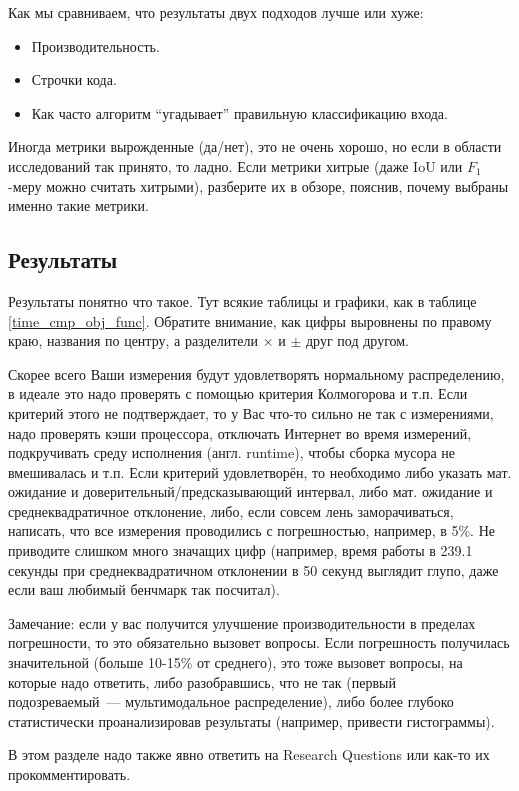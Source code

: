 Как мы сравниваем, что результаты двух подходов лучше или хуже:
\begin{itemize}
    \item Производительность.
    \item Строчки кода.
    \item Как часто алгоритм \enquote{угадывает} правильную класси\-фикацию входа.
\end{itemize}

\noindent Иногда метрики вырожденные (да/нет), это не очень хорошо, но если в области исследований так принято, то ладно.
Если метрики хитрые (даже IoU или $F_1$-меру можно считать хитрыми), разберите их в обзоре, пояснив, почему выбраны именно такие метрики.

\subsection{Результаты}
Результаты понятно что такое.
Тут всякие таблицы и графики, как в таблице \ref{time_cmp_obj_func}.
Обратите внимание, как цифры выровнены по правому краю, названия по центру, а разделители $\times$ и $\pm$ друг под другом.

Скорее всего Ваши измерения будут удовлетворять нормальному распределению, в идеале это надо проверять с помощью критерия Кол\-могорова и т.п.
Если критерий этого не подтверждает, то у Вас что-то сильно не так с измерениями, надо проверять кэши процессора, отключать Интернет во время измерений, подкручивать среду исполне\-ния (англ. runtime), что\-бы сборка мусора не вмешивалась и т.п.
Если критерий удовлетворён, то необходимо либо указать мат. ожидание и доверительный/предсказы\-вающий интервал, либо мат. ожидание и среднеквадратичное отклонение, либо, если совсем лень заморачиваться, написать, что все измерения проводились с погрешностью, например, в 5\%.
Не приводите слишком много значащих цифр (например, время работы в 239.1 секунды при среднеквадратичном отклонении в 50 секунд выглядит глупо, даже если ваш любимый бенчмарк так посчитал).

Замечание: если у вас получится улуч\-шение производительности в пределах погреш\-ности, то это обязательно вызовет вопросы.
Если погрешность получилась значительной (больше 10-15\% от среднего), это тоже вызовет вопросы, на которые надо ответить, либо разобравшись, что не так (первый подозреваемый~--- мультимодальное распределение), либо более глубоко статистически проанализировав результаты (например, привести гистограммы).

В этом разделе надо также явно ответить на Research Questions или как-то их прокомментировать.

